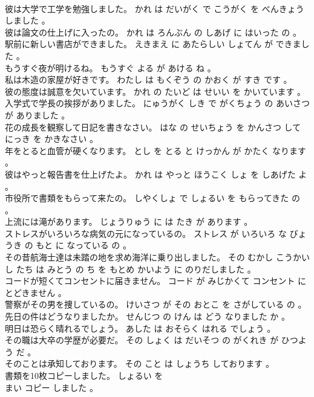 \documentclass[8pt]{extreport}
\begin{document}
\begin{CJK}{UTF8}{min}
\\	彼は大学で工学を勉強しました。	かれ は だいがく で こうがく を べんきょう しました 。 
\\	彼は論文の仕上げに入ったの。	かれ は ろんぶん の しあげ に はいった の 。 
\\	駅前に新しい書店ができました。	えきまえ に あたらしい しょてん が できました 。 
\\	もうすぐ夜が明けるね。	もうすぐ よる が あける ね 。 
\\	私は木造の家屋が好きです。	わたし は もくぞう の かおく が すき です 。 
\\	彼の態度は誠意を欠いています。	かれ の たいど は せいい を かいています 。 
\\	入学式で学長の挨拶がありました。	にゅうがく しき で がくちょう の あいさつ が ありました 。 
\\	花の成長を観察して日記を書きなさい。	はな の せいちょう を かんさつ して にっき を かきなさい 。 
\\	年をとると血管が硬くなります。	とし を とる と けっかん が かたく なります 。 
\\	彼はやっと報告書を仕上げたよ。	かれ は やっと ほうこく しょ を しあげた よ 。 
\\	市役所で書類をもらって来たの。	しやくしょ で しょるい を もらってきた の 。 
\\	上流には滝があります。	じょうりゅう に は たき が あります 。 
\\	ストレスがいろいろな病気の元になっているの。	ストレス が いろいろ な びょうき の もと に なっている の 。 
\\	その昔航海士達は未踏の地を求め海洋に乗り出しました。	その むかし こうかい し たち は みとう の ち を もとめ かいよう に のりだしました 。 
\\	コードが短くてコンセントに届きません。	コード が みじかくて コンセント に とどきません 。 
\\	警察がその男を捜しているの。	けいさつ が その おとこ を さがしている の 。 
\\	先日の件はどうなりましたか。	せんじつ の けん は どう なりました か 。 
\\	明日は恐らく晴れるでしょう。	あした は おそらく はれる でしょう 。 
\\	その職は大卒の学歴が必要だ。	その しょく は だいそつ の がくれき が ひつよう だ 。 
\\	そのことは承知しております。	その こと は しょうち しております 。 
\\	書類を10枚コピーしました。	しょるい を 
\\	まい コピー しました 。 

\end{CJK}
\end{document}
